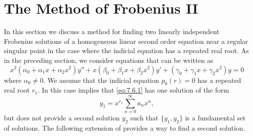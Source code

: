 \section{The Method of Frobenius II}\label{sec:frobenius_ii}

In this section we discuss a method for finding two linearly
independent Frobenius solutions of a homogeneous linear second order
equation near a regular singular point in the case where the indicial
equation has a repeated real root. As in the preceding section, we
consider equations that can be written as
\begin{equation} \label{eq:7.6.1}
x^2(\alpha_0+\alpha_1x+\alpha_2x^2)y''+x(\beta_0+\beta_1x+\beta_2x^2)y'
+(\gamma_0+\gamma_1x+\gamma_2x^2)y=0
\end{equation}
where $\alpha_0\ne0$. We assume that the indicial equation $p_0(r)=0$
has a repeated real root $r_1$. In this case 
implies that \eqref{eq:7.6.1} has one solution of the form
\[
y_1=x^{r_1}\sum_{n=0}^\infty a_nx^n,
\]
but does not provide a second solution $y_2$ such that $\{y_1,y_2\}$
is a fundamental set of solutions. The following extension of
 provides a way to find a second solution.

